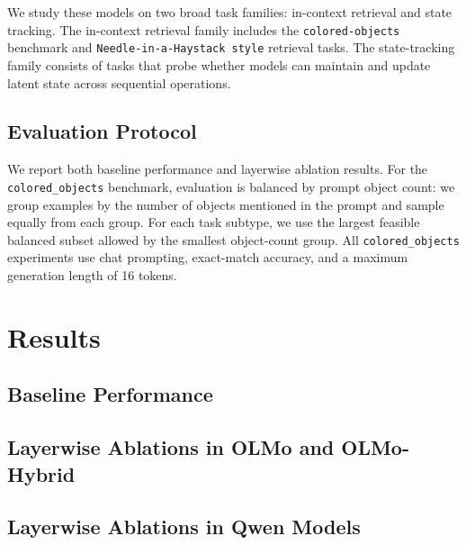 \documentclass{article}
\begin{document}
We study these models on two broad task families: in-context retrieval and state tracking. 
The in-context retrieval family includes the \texttt{colored-objects} benchmark and \texttt{Needle-in-a-Haystack style} retrieval tasks. 
The state-tracking family consists of tasks that probe whether models can maintain and update latent state across sequential operations.

\subsection{Evaluation Protocol}\label{sec:eval}
We report both baseline performance and layerwise ablation results. For the \texttt{colored\_objects} benchmark, evaluation is balanced by prompt object count: 
we group examples by the number of objects mentioned in the prompt and sample equally from each group.
For each task subtype, we use the largest feasible balanced subset allowed by the smallest object-count group. 
All \texttt{colored\_objects} experiments use chat prompting, exact-match accuracy, and a maximum generation length of 16 tokens.

\section{Results}
\label{sec:results}

\subsection{Baseline Performance}
\subsection{Layerwise Ablations in OLMo and OLMo-Hybrid}
\subsection{Layerwise Ablations in Qwen Models}
\end{document}
